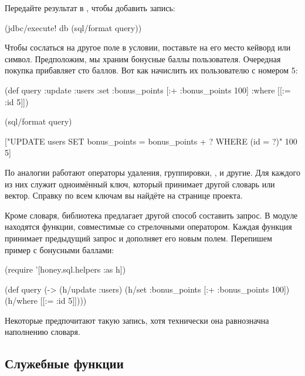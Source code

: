 \pagebreaklarge

Передайте результат в , чтобы добавить запись:

\begin{english}
  \begin{clojure}
(jdbc/execute! db (sql/format query))
  \end{clojure}
\end{english}

Чтобы сослаться на другое поле в условии, поставьте на его место кейворд или символ. Предположим, мы храним бонусные баллы пользователя. Очередная покупка прибавляет сто баллов. Вот как начислить их пользователю с номером 5:

\begin{english}
  \begin{clojure}
(def query
  {:update :users
   :set {:bonus_points [:+ :bonus_points 100]}
   :where [[:= :id 5]]})

(sql/format query)

["UPDATE users
  SET bonus_points = bonus_points + ?
  WHERE (id = ?)" 100 5]
  \end{clojure}
\end{english}

По аналогии работают операторы удаления, группировки, ,  и другие. Для каждого из них служит одноимённый ключ, который принимает другой словарь или вектор. Справку по всем ключам вы найдёте на странице проекта.

Кроме словаря, библиотека предлагает другой способ составить запрос. В модуле  находятся функции, совместимые со стрелочными оператором. Каждая функция принимает предыдущий запрос и дополняет его новым полем. Перепишем пример с бонусными баллами:

\begin{english}
  \begin{clojure}
(require '[honey.sql.helpers :as h])

(def query
  (-> (h/update :users)
      (h/set {:bonus_points [:+ :bonus_points 100]})
      (h/where [[:= :id 5]])))
  \end{clojure}
\end{english}

Некоторые предпочитают такую запись, хотя технически она равнозначна наполнению словаря.

\subsection{Служебные функции}

